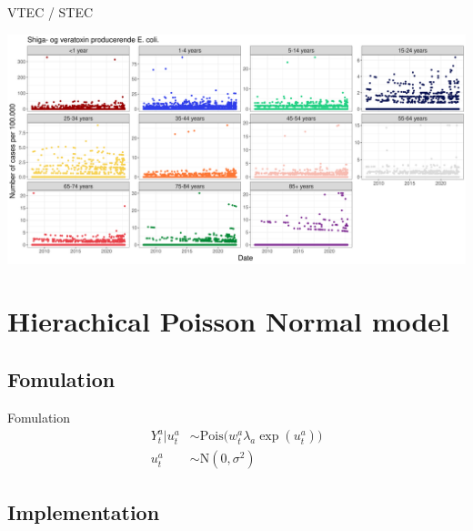 \documentclass[aspectratio=169]{beamer}
\begin{document}
\begin{frame}{VTEC / STEC}
\tiny

\includegraphics[width=1\linewidth]{../figures/ShigaogveratoxinproducerendeEcolixAgeGroup}

\normalsize
\end{frame}

\hypertarget{hierachical-poisson-normal-model}{%
\section{Hierachical Poisson Normal
model}\label{hierachical-poisson-normal-model}}

\hypertarget{fomulation}{%
\subsection{Fomulation}\label{fomulation}}

\begin{frame}{Fomulation}
\begin{subequations}
  \begin{alignat}{2}
    Y_{t}^{a}|u_{t}^{a} &\sim \mathrm{Pois} \big( w_{t}^{a} \lambda_{a} \exp(u_{t}^{a}) \big) \label{eq:pois_ln0} \\ 
    u_{t}^{a} &\sim \mathrm{N}(0,\sigma^2) \label{eq:pois_ln1}
  \end{alignat}
\end{subequations}
\end{frame}

\hypertarget{implementation}{%
\subsection{Implementation}\label{implementation}}
\end{document}
